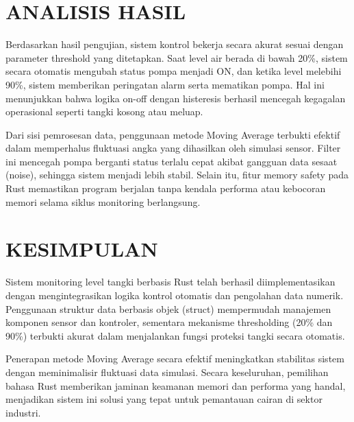 \documentclass[12pt]{article}
\begin{document}
\section{ANALISIS HASIL}
Berdasarkan hasil pengujian, sistem kontrol bekerja secara akurat sesuai dengan parameter threshold yang ditetapkan. Saat level air berada di bawah 20\%, sistem secara otomatis mengubah status pompa menjadi ON, dan ketika level melebihi 90\%, sistem memberikan peringatan alarm serta mematikan pompa. Hal ini menunjukkan bahwa logika on-off dengan histeresis berhasil mencegah kegagalan operasional seperti tangki kosong atau meluap.

Dari sisi pemrosesan data, penggunaan metode Moving Average terbukti efektif dalam memperhalus fluktuasi angka yang dihasilkan oleh simulasi sensor. Filter ini mencegah pompa berganti status terlalu cepat akibat gangguan data sesaat (noise), sehingga sistem menjadi lebih stabil. Selain itu, fitur memory safety pada Rust memastikan program berjalan tanpa kendala performa atau kebocoran memori selama siklus monitoring berlangsung.

\section{KESIMPULAN}
Sistem monitoring level tangki berbasis Rust telah berhasil diimplementasikan dengan mengintegrasikan logika kontrol otomatis dan pengolahan data numerik. Penggunaan struktur data berbasis objek (struct) mempermudah manajemen komponen sensor dan kontroler, sementara mekanisme thresholding (20\% dan 90\%) terbukti akurat dalam menjalankan fungsi proteksi tangki secara otomatis.

Penerapan metode Moving Average secara efektif meningkatkan stabilitas sistem dengan meminimalisir fluktuasi data simulasi. Secara keseluruhan, pemilihan bahasa Rust memberikan jaminan keamanan memori dan performa yang handal, menjadikan sistem ini solusi yang tepat untuk pemantauan cairan di sektor industri.
\end{document}
